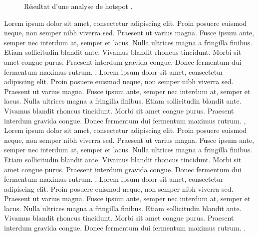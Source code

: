 \medskip

\begin{figure}[hbt!]
  \centering
  \caption{Résultat d'une analyse de hotspot \parencite{kalinic_kernel_2018}.}
  \label{fig:vue-snoc-pos}
\end{figure}
\FloatBarrier

Lorem ipsum dolor sit amet, consectetur adipiscing elit. Proin posuere euismod neque, non semper nibh viverra sed. Praesent ut varius magna. Fusce ipsum ante, semper nec interdum at, semper et lacus. Nulla ultrices magna a fringilla finibus. Etiam sollicitudin blandit ante. Vivamus blandit rhoncus tincidunt. Morbi sit amet congue purus. Praesent interdum gravida congue. Donec fermentum dui fermentum maximus rutrum. \parencite{hart_kernel_2014,ansari_methods_2014,kalinic_kernel_2018}, Lorem ipsum dolor sit amet, consectetur adipiscing elit. Proin posuere euismod neque, non semper nibh viverra sed. Praesent ut varius magna. Fusce ipsum ante, semper nec interdum at, semper et lacus. Nulla ultrices magna a fringilla finibus. Etiam sollicitudin blandit ante. Vivamus blandit rhoncus tincidunt. Morbi sit amet congue purus. Praesent interdum gravida congue. Donec fermentum dui fermentum maximus rutrum. \parencite{anderson_kernel_2009,montella_comparative_2010,yu_comparative_2014}, Lorem ipsum dolor sit amet, consectetur adipiscing elit. Proin posuere euismod neque, non semper nibh viverra sed. Praesent ut varius magna. Fusce ipsum ante, semper nec interdum at, semper et lacus. Nulla ultrices magna a fringilla finibus. Etiam sollicitudin blandit ante. Vivamus blandit rhoncus tincidunt. Morbi sit amet congue purus. Praesent interdum gravida congue. Donec fermentum dui fermentum maximus rutrum. \parencite{lin_hotspot_2010}, Lorem ipsum dolor sit amet, consectetur adipiscing elit. Proin posuere euismod neque, non semper nibh viverra sed. Praesent ut varius magna. Fusce ipsum ante, semper nec interdum at, semper et lacus. Nulla ultrices magna a fringilla finibus. Etiam sollicitudin blandit ante. Vivamus blandit rhoncus tincidunt. Morbi sit amet congue purus. Praesent interdum gravida congue. Donec fermentum dui fermentum maximus rutrum. \parencite{bagstad_evaluating_2017}.

